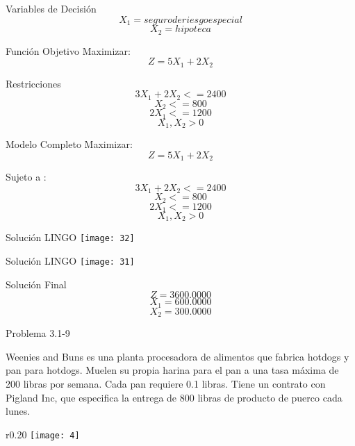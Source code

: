 \documentclass{beamer}
\begin{document}
\begin{frame}[fragile]{Variables de Decisión}
\[X_{1} = seguro de riesgo especial\]
\[X_{2} = hipoteca\]

\end{frame}

\begin{frame}[fragile]{Función Objetivo}
Maximizar:\\
\[Z = 5X_{1} + 2X_{2}\]
\end{frame}

\begin{frame}[fragile]{Restricciones}
\[3X_{1} + 2X_{2} <= 2400\]
\[X_{2} <= 800\]
\[2X_{1} <= 1200\]
\[X_{1}, X_{2} > 0\]

\end{frame}

\begin{frame}[fragile]{Modelo Completo}
Maximizar:\\
\[Z = 5X_{1} + 2X_{2}\]

Sujeto a :\\
\[3X_{1} + 2X_{2} <= 2400\]
\[X_{2} <= 800\]
\[2X_{1} <= 1200\]
\[X_{1}, X_{2} > 0\]
\end{frame}

\begin{frame}[fragile]{Solución LINGO}
    \texttt{[image: 32]}
\end{frame}
\begin{frame}[fragile]{Solución LINGO}
    \texttt{[image: 31]}
\end{frame}

\begin{frame}[fragile]{Solución Final}
\[Z = 3 600.0000\]
\[X_{1} = 600.0000\]
\[X_{2} = 300.0000\]
\end{frame}

\begin{frame}[t,fragile]{Problema  3.1-9}

Weenies and Buns es una planta procesadora de alimentos que fabrica hotdogs y pan para hotdogs. Muelen su propia harina para el pan a una tasa máxima de 200 libras por semana. Cada pan requiere 0.1 libras. Tiene un contrato con Pigland Inc, que especifica la entrega de 800 libras de producto de puerco cada lunes.
\begin{wrapfigure}{r}{0.20\textwidth}
    \centering
    \texttt{[image: 4]}
\end{wrapfigure}
\end{frame}
\end{document}
